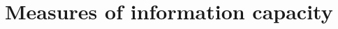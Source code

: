 \chapter{Measures of information capacity}
\label{sec:infocap}

%

\def\Fone{$\mathcal{F}$}
\def\Ftwo{$\mathcal{G}$}
\def\Ftrue{$\Theta$}


